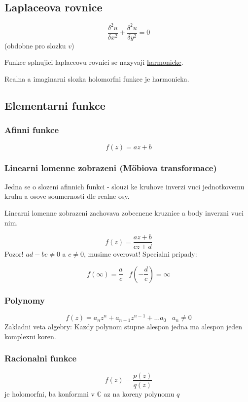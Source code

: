 \subsection*{Laplaceova rovnice}
\begin{equation}
\label{eq:laplace_r}
\frac{\delta ^2 u}{\delta x^2} + \frac{\delta ^2 u}{\delta y^2} = 0
\end{equation}
(obdobne pro slozku $v$)

Funkce splnujici laplaceovu rovnici se nazyvaji \underline{harmonicke}.

Realna a imaginarni slozka holomorfni funkce je harmonicka.

\subsection*{Elementarni funkce}
\subsubsection*{Afinni funkce}
\begin{equation}
\label{eq:afinni}
f(z) = az+b
\end{equation}

\subsubsection*{Linearni lomenne zobrazeni (M\" obiova transformace)}
Jedna se o slozeni afinnich funkci - slouzi ke kruhove inverzi vuci jednotkovemu kruhu a osove soumernosti dle realne osy.

Linearni lomenne zobrazeni zachovava zobecnene kruznice a body inverzni vuci nim.

\begin{equation}
\label{eq:mobiova}
f(z) = \frac{az+b}{cz+d}
\end{equation}
Pozor! $ad-bc \neq 0$ a $c \neq 0$, musime overovat!
Specialni pripady:

$$f(\infty) = \frac{a}{c}\; \; \; f\left( -\frac{d}{c}\right) = \infty$$

\subsubsection*{Polynomy}
$$f(z) = a_nz^n + a_{n-1}z^{n-1}+ \dots a_0\; \; \; a_n \neq 0$$
Zakladni veta algebry: Kazdy polynom stupne alespon jedna ma alespon jeden komplexni koren.

\subsubsection*{Racionalni funkce}
$$f(z) = \frac{p(z)}{q(z)}$$
je holomorfni, ba konformni v $\mathbb{C}$ az na koreny polynomu $q$

